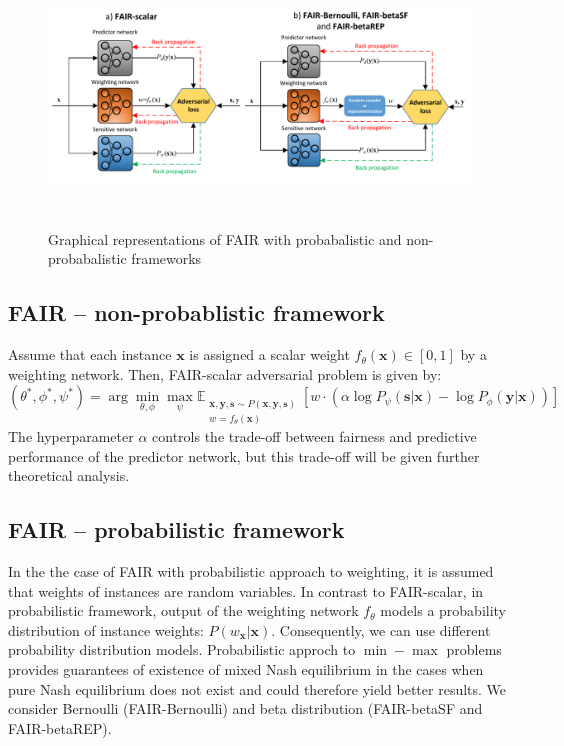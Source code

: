 \documentclass[preprint,12pt]{elsarticle}
\begin{document}
\begin{figure}[t!]
	\vskip 0.2in
	\center
	\includegraphics[angle=0, width=1\textwidth, height = 2.7in]{Fig1.pdf}
	\captionsetup{justification=centering}
	\caption{Graphical representations of FAIR with probabalistic and non-probabalistic frameworks}
	\label{fig:Fig1}
	\vskip -0.2in
\end{figure}

\subsection{FAIR -- non-probablistic framework}
Assume that each instance $\mathbf{x}$ is assigned a scalar weight $f_\theta(\mathbf{x})\in[0,1]$ by a weighting network. Then, FAIR-scalar adversarial problem is given by:
\begin{equation}
\label{Eq:Loss-scalar}
(\theta^*,\phi^*,\psi^*) = \arg\min_{\theta,\phi}\max_{\psi}\mathbb{E}_{\substack{\mathbf{x},\mathbf{y},\mathbf{s} \sim P(\mathbf{x},\mathbf{y},\mathbf{s})\\w=f_\theta(\mathbf{x})}} [w \cdot(\alpha\log P_{\psi}(\mathbf{s}|\mathbf{x})
- \log P_{\phi}(\mathbf{y}|\mathbf{x}))]
\end{equation}
The hyperparameter $\alpha$ controls the trade-off between fairness and predictive performance of the predictor network, but this trade-off will be given further theoretical analysis.


\subsection{FAIR -- probabilistic framework}

In the the case of FAIR with probabilistic approach to weighting, it is assumed that  weights of instances are random variables. 
In contrast to FAIR-scalar, in probabilistic framework, output of the weighting network $f_\theta$ models a probability distribution of instance weights: $P(w_\mathbf{x}|\mathbf{x})$. Consequently, we can use different probability distribution models. Probabilistic approch to $\min-\max$ problems provides guarantees of existence of mixed Nash equilibrium in the cases when pure Nash equilibrium does not exist \cite{tadelis2013game} and could therefore yield better results. We consider Bernoulli (FAIR-Bernoulli) and beta distribution (FAIR-betaSF and FAIR-betaREP). 
\end{document}
